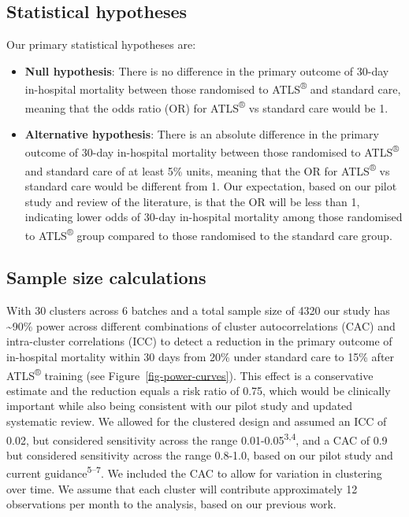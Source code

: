 \documentclass[
]{scrartcl}
\providecommand{\tightlist}{%
  \setlength{\itemsep}{0pt}\setlength{\parskip}{0pt}}\usepackage{longtable,booktabs,array}
\begin{document}
\hypertarget{statistical-hypotheses}{%
\subsection{Statistical hypotheses}\label{statistical-hypotheses}}

Our primary statistical hypotheses are:

\begin{itemize}
\tightlist
\item
  \textbf{Null hypothesis}: There is no difference in the primary
  outcome of 30-day in-hospital mortality between those randomised to
  ATLS\textsuperscript{®} and standard care, meaning that the odds ratio
  (OR) for ATLS\textsuperscript{®} vs standard care would be 1.
\item
  \textbf{Alternative hypothesis}: There is an absolute difference in
  the primary outcome of 30-day in-hospital mortality between those
  randomised to ATLS\textsuperscript{®} and standard care of at least
  5\% units, meaning that the OR for ATLS\textsuperscript{®} vs standard
  care would be different from 1. Our expectation, based on our pilot
  study and review of the literature, is that the OR will be less than
  1, indicating lower odds of 30-day in-hospital mortality among those
  randomised to ATLS\textsuperscript{®} group compared to those
  randomised to the standard care group.
\end{itemize}

\hypertarget{sample-size-calculations}{%
\subsection{Sample size calculations}\label{sample-size-calculations}}

With 30 clusters across 6 batches and a total sample size of 4320 our
study has \textasciitilde90\% power across different combinations of
cluster autocorrelations (CAC) and intra-cluster correlations (ICC) to
detect a reduction in the primary outcome of in-hospital mortality
within 30 days from 20\% under standard care to 15\% after
ATLS\textsuperscript{®} training (see Figure~\ref{fig-power-curves}).
This effect is a conservative estimate and the reduction equals a risk
ratio of 0.75, which would be clinically important while also being
consistent with our pilot study and updated systematic review. We
allowed for the clustered design and assumed an ICC of 0.02, but
considered sensitivity across the range 0.01-0.05\textsuperscript{3,4},
and a CAC of 0.9 but considered sensitivity across the range 0.8-1.0,
based on our pilot study and current guidance\textsuperscript{5--7}. We
included the CAC to allow for variation in clustering over time. We
assume that each cluster will contribute approximately 12 observations
per month to the analysis, based on our previous work.
\end{document}
